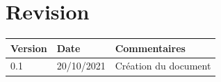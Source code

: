 \documentclass[a4paper, twoside, 12pt]{report}
\title{\titleOfDoc}
\author{\authors}
\begin{document}


\chapter*{Revision}
\begin{table}[!ht] %
	\begin{tabular}{ | m{3cm} | m{3cm}| m{8cm} | } 
		\hline
		\textbf{Version} & \textbf{Date} & \textbf{Commentaires} \\
		\hline
			0.1 & 20/10/2021 & Création du document\\
		\hline
	\end{tabular}
\end{table}

\tableofcontents
\newpage





\end{document}
